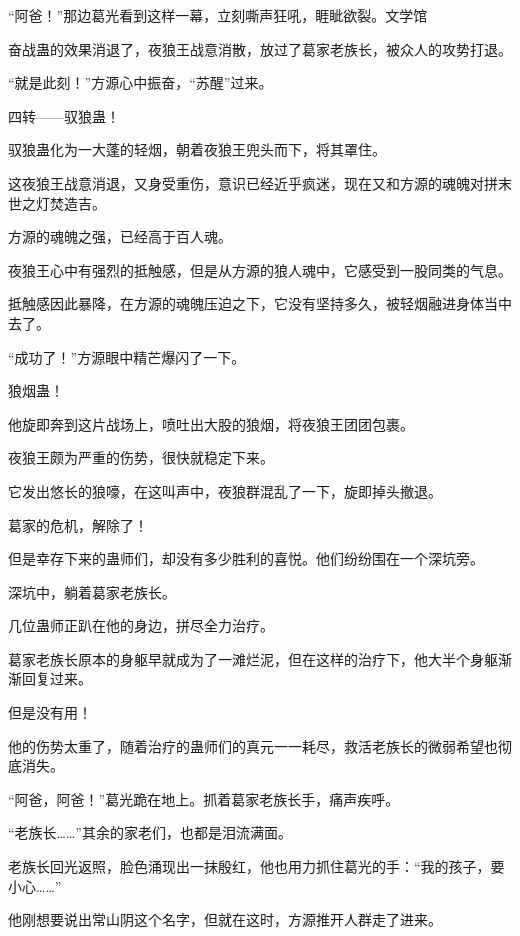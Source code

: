 
\begin{this_body}



“阿爸！”那边葛光看到这样一幕，立刻嘶声狂吼，睚眦欲裂。文学馆

奋战蛊的效果消退了，夜狼王战意消散，放过了葛家老族长，被众人的攻势打退。

“就是此刻！”方源心中振奋，“苏醒”过来。

四转——驭狼蛊！

驭狼蛊化为一大蓬的轻烟，朝着夜狼王兜头而下，将其罩住。

这夜狼王战意消退，又身受重伤，意识已经近乎疯迷，现在又和方源的魂魄对拼末世之灯焚造吉。

方源的魂魄之强，已经高于百人魂。

夜狼王心中有强烈的抵触感，但是从方源的狼人魂中，它感受到一股同类的气息。

抵触感因此暴降，在方源的魂魄压迫之下，它没有坚持多久，被轻烟融进身体当中去了。

“成功了！”方源眼中精芒爆闪了一下。

狼烟蛊！

他旋即奔到这片战场上，喷吐出大股的狼烟，将夜狼王团团包裹。

夜狼王颇为严重的伤势，很快就稳定下来。

它发出悠长的狼嚎，在这叫声中，夜狼群混乱了一下，旋即掉头撤退。

葛家的危机，解除了！

但是幸存下来的蛊师们，却没有多少胜利的喜悦。他们纷纷围在一个深坑旁。

深坑中，躺着葛家老族长。

几位蛊师正趴在他的身边，拼尽全力治疗。

葛家老族长原本的身躯早就成为了一滩烂泥，但在这样的治疗下，他大半个身躯渐渐回复过来。

但是没有用！

他的伤势太重了，随着治疗的蛊师们的真元一一耗尽，救活老族长的微弱希望也彻底消失。

“阿爸，阿爸！”葛光跪在地上。抓着葛家老族长手，痛声疾呼。

“老族长……”其余的家老们，也都是泪流满面。

老族长回光返照，脸色涌现出一抹殷红，他也用力抓住葛光的手：“我的孩子，要小心……”

他刚想要说出常山阴这个名字，但就在这时，方源推开人群走了进来。


\end{this_body}

